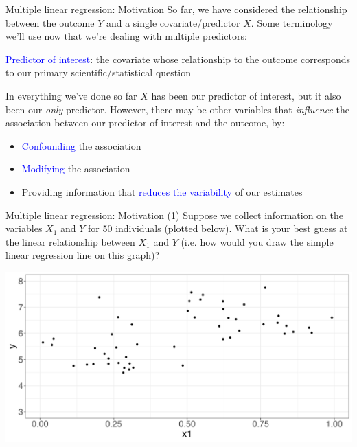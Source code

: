 \documentclass[10pt,t]{beamer}
\begin{document}
\begin{frame}{Multiple linear regression: Motivation}
So far, we have considered the relationship between the outcome $Y$ and a single covariate/predictor $X$. Some terminology we'll use now that we're dealing with multiple predictors:

\vspace{0.3cm}

\textcolor{blue}{Predictor of interest}: the covariate whose relationship to the outcome corresponds to our primary scientific/statistical question \pause

\vspace{0.3cm}

In everything we've done so far $X$ has been our predictor of interest, but it also been our \textit{only} predictor. However, there may be other variables that \textit{influence} the association between our predictor of interest and the outcome, by:

\vspace{0.3cm}

\begin{itemize}
	\item \textcolor{blue}{Confounding} the association
	\item \textcolor{blue}{Modifying} the association
	\item Providing information that \textcolor{blue}{reduces the variability} of our estimates
\end{itemize}

\end{frame}

\begin{frame}{Multiple linear regression: Motivation}
(1) Suppose we collect information on the variables $X_1$ and $Y$ for 50 individuals (plotted below). What is your best guess at the linear relationship between $X_1$ and $Y$ (i.e. how would you draw the simple linear regression line on this graph)?

\vspace{0.3cm}

\centering \includegraphics[scale=0.3]{multreg1.png}
\end{frame}
\end{document}
